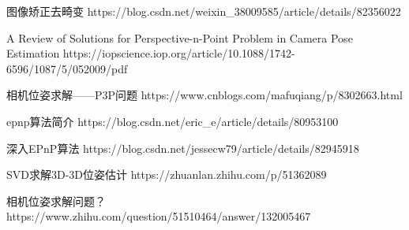 图像矫正去畸变
https://blog.csdn.net/weixin\_38009585/article/details/82356022


A Review of Solutions for Perspective-n-Point Problem in Camera Pose Estimation
https://iopscience.iop.org/article/10.1088/1742-6596/1087/5/052009/pdf


相机位姿求解——P3P问题
https://www.cnblogs.com/mafuqiang/p/8302663.html

epnp算法简介
https://blog.csdn.net/eric\_e/article/details/80953100

深入EPnP算法
https://blog.csdn.net/jessecw79/article/details/82945918

SVD求解3D-3D位姿估计
https://zhuanlan.zhihu.com/p/51362089


相机位姿求解问题？
https://www.zhihu.com/question/51510464/answer/132005467



